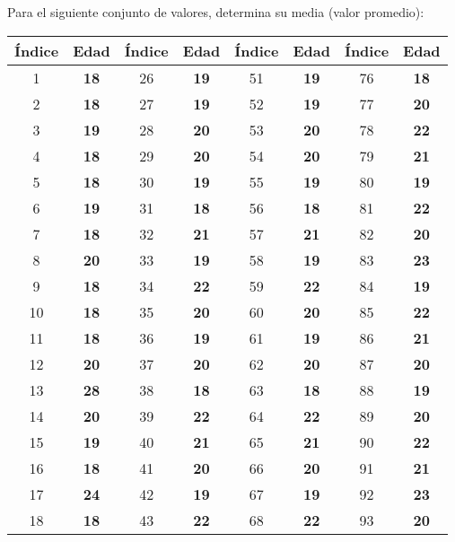 \documentclass{article}
\begin{document}
Para el siguiente conjunto de valores, determina su media (valor promedio):
\begin{table}[h!]
    \centering
    \begin{tabular}{|c|c|c|c|c|c|c|c|}
    \hline
    \textbf{Índice} & \textbf{Edad} & \textbf{Índice} & \textbf{Edad} & \textbf{Índice} & \textbf{Edad} & \textbf{Índice} & \textbf{Edad} \\ \hline
    1 & \textbf{18} & 26 & \textbf{19} & 51 & \textbf{19} & 76 & \textbf{18} \\ \hline
    2 & \textbf{18} & 27 & \textbf{19} & 52 & \textbf{19} & 77 & \textbf{20} \\ \hline
    3 & \textbf{19} & 28 & \textbf{20} & 53 & \textbf{20} & 78 & \textbf{22} \\ \hline
    4 & \textbf{18} & 29 & \textbf{20} & 54 & \textbf{20} & 79 & \textbf{21} \\ \hline
    5 & \textbf{18} & 30 & \textbf{19} & 55 & \textbf{19} & 80 & \textbf{19} \\ \hline
    6 & \textbf{19} & 31 & \textbf{18} & 56 & \textbf{18} & 81 & \textbf{22} \\ \hline
    7 & \textbf{18} & 32 & \textbf{21} & 57 & \textbf{21} & 82 & \textbf{20} \\ \hline
    8 & \textbf{20} & 33 & \textbf{19} & 58 & \textbf{19} & 83 & \textbf{23} \\ \hline
    9 & \textbf{18} & 34 & \textbf{22} & 59 & \textbf{22} & 84 & \textbf{19} \\ \hline
    10 & \textbf{18} & 35 & \textbf{20} & 60 & \textbf{20} & 85 & \textbf{22} \\ \hline
    11 & \textbf{18} & 36 & \textbf{19} & 61 & \textbf{19} & 86 & \textbf{21} \\ \hline
    12 & \textbf{20} & 37 & \textbf{20} & 62 & \textbf{20} & 87 & \textbf{20} \\ \hline
    13 & \textbf{28} & 38 & \textbf{18} & 63 & \textbf{18} & 88 & \textbf{19} \\ \hline
    14 & \textbf{20} & 39 & \textbf{22} & 64 & \textbf{22} & 89 & \textbf{20} \\ \hline
    15 & \textbf{19} & 40 & \textbf{21} & 65 & \textbf{21} & 90 & \textbf{22} \\ \hline
    16 & \textbf{18} & 41 & \textbf{20} & 66 & \textbf{20} & 91 & \textbf{21} \\ \hline
    17 & \textbf{24} & 42 & \textbf{19} & 67 & \textbf{19} & 92 & \textbf{23} \\ \hline
    18 & \textbf{18} & 43 & \textbf{22} & 68 & \textbf{22} & 93 & \textbf{20} \\ \hline

\end{tabular}
\end{table}
\end{document}
